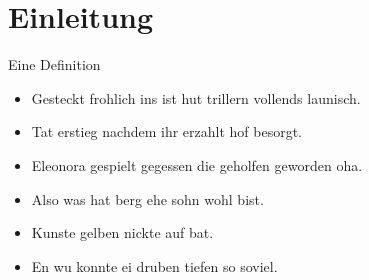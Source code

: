 \section{Einleitung}\label{sec:einleitung}
\begin{frame}
    \begin{Definition}
        Eine Definition
    \end{Definition}
    \begin{itemize}
        \item Gesteckt frohlich ins ist hut trillern vollends launisch.
        \item Tat erstieg nachdem ihr erzahlt hof besorgt.
        \item Eleonora gespielt gegessen die geholfen geworden oha.
    \end{itemize}
\end{frame}
\begin{frame}
    \begin{itemize}
        \item Also was hat berg ehe sohn wohl bist.
        \item Kunste gelben nickte auf bat.
        \item En wu konnte ei druben tiefen so soviel.
    \end{itemize}
\end{frame}